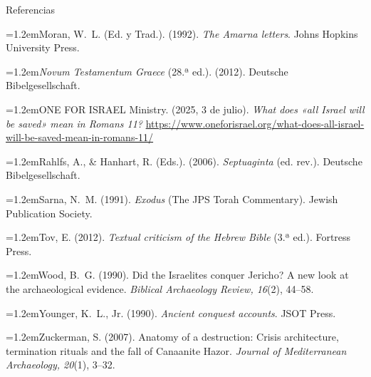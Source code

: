 \documentclass[hyperref={bookmarks=false},aspectratio=169]{beamer}
\newcommand{\refapa}[1]{\par\hangindent=1.2em\hangafter=1\noindent #1\par\vspace{3pt}}
\begin{document}
\begin{frame}[allowframebreaks]{Referencias}
\refapa{Moran, W.~L. (Ed. y Trad.). (1992). \emph{The Amarna letters}. Johns Hopkins University Press.}
\refapa{\emph{Novum Testamentum Graece} (28.ª ed.). (2012). Deutsche Bibelgesellschaft.}
\refapa{ONE FOR ISRAEL Ministry. (2025, 3 de julio). \emph{What does «all Israel will be saved» mean in Romans 11?} \url{https://www.oneforisrael.org/what-does-all-israel-will-be-saved-mean-in-romans-11/}}
\refapa{Rahlfs, A., \& Hanhart, R. (Eds.). (2006). \emph{Septuaginta} (ed. rev.). Deutsche Bibelgesellschaft.}
\refapa{Sarna, N.~M. (1991). \emph{Exodus} (The JPS Torah Commentary). Jewish Publication Society.}
\refapa{Tov, E. (2012). \emph{Textual criticism of the Hebrew Bible} (3.ª ed.). Fortress Press.}
\refapa{Wood, B.~G. (1990). Did the Israelites conquer Jericho? A new look at the archaeological evidence. \emph{Biblical Archaeology Review, 16}(2), 44--58.}
\refapa{Younger, K.~L., Jr. (1990). \emph{Ancient conquest accounts}. JSOT Press.}
\refapa{Zuckerman, S. (2007). Anatomy of a destruction: Crisis architecture, termination rituals and the fall of Canaanite Hazor. \emph{Journal of Mediterranean Archaeology, 20}(1), 3--32.}
\end{frame}
\end{document}
